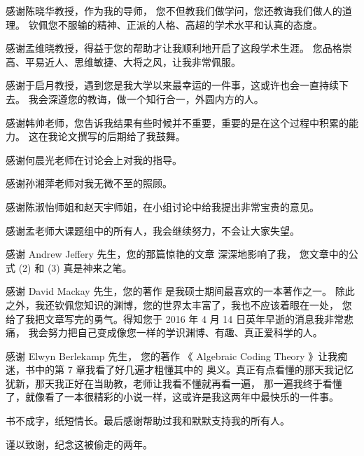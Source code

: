 

感谢陈晓华教授，作为我的导师，
您不但教我们做学问，您还教诲我们做人的道理。
钦佩您不服输的精神、正派的人格、高超的学术水平和认真的态度。

感谢孟维晓教授，得益于您的帮助才让我顺利地开启了这段学术生涯。
您品格崇高、平易近人、思维敏捷、大将之风，让我非常佩服。

感谢于启月教授，遇到您是我大学以来最幸运的一件事，这或许也会一直持续下去。
我会深遵您的教诲，做一个知行合一，外圆内方的人。

感谢韩帅老师，您告诉我结果有些时候并不重要，重要的是在这个过程中积累的能力。
这在我论文撰写的后期给了我鼓舞。

感谢何晨光老师在讨论会上对我的指导。

感谢孙湘萍老师对我无微不至的照顾。

感谢陈淑怡师姐和赵天宇师姐，在小组讨论中给我提出非常宝贵的意见。

感谢孟老师大课题组中的所有人，我会继续努力，不会让大家失望。

感谢 Andrew Jeffery 先生，您的那篇惊艳的文章 深深地影响了我，
您文章中的公式 (2) 和 (3) 真是神来之笔。

感谢 David Mackay 先生，您的著作  是我硕士期间最喜欢的一本著作之一。
除此之外，我还钦佩您知识的渊博，您的世界太丰富了，我也不应该着眼在一处，
您给了我把文章写完的勇气。得知您于 2016 年 4 月 14 日英年早逝的消息我非常悲痛，
我会努力把自己变成像您一样的学识渊博、有趣、真正爱科学的人。

感谢 Elwyn Berlekamp 先生， 您的著作
《 Algebraic Coding Theory 》让我痴迷，书中的第 7 章我看了好几遍才粗懂其中的
奥义。真正有点看懂的那天我记忆犹新，那天我正好在当助教，老师让我看不懂就再看一遍，
那一遍我终于看懂了，就像看了一本很精彩的小说一样，这或许是我这两年中最快乐的一件事。

书不成字，纸短情长。最后感谢帮助过我和默默支持我的所有人。

谨以致谢，纪念这被偷走的两年。
